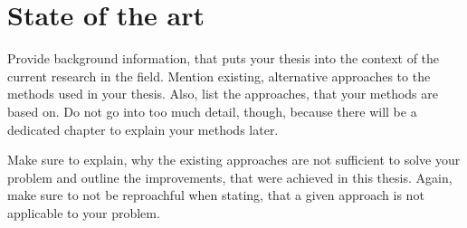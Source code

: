 \chapter{State of the art}

Provide background information, that puts your thesis into the context of the current research in the field.
Mention existing, alternative approaches to the methods used in your thesis.
Also, list the approaches, that your methods are based on.
Do not go into too much detail, though, because there will be a dedicated chapter to explain your methods later.

Make sure to explain, why the existing approaches are not sufficient to solve your problem and outline the improvements, that were achieved in this thesis.
Again, make sure to not be reproachful when stating, that a given approach is not applicable to your problem.

